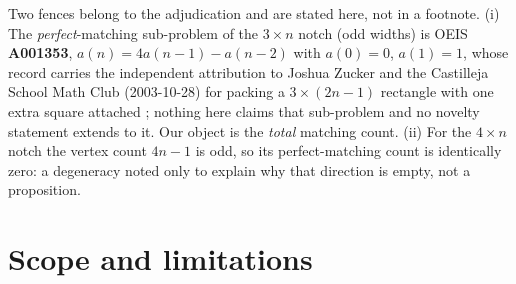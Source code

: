\documentclass[11pt]{article}
\begin{document}
Two fences belong to the adjudication and are stated here, not in a footnote.
(i) The \emph{perfect}-matching sub-problem of the $3 \times n$ notch (odd
widths) is OEIS \textbf{A001353}, $a(n) = 4a(n-1) - a(n-2)$ with $a(0) = 0$,
$a(1) = 1$, whose record carries the independent attribution to Joshua Zucker and
the Castilleja School Math Club (2003-10-28) for packing a $3 \times (2n-1)$
rectangle with one extra square attached \cite{oeis-a001353}; nothing here claims
that sub-problem and no novelty statement extends to it. Our object is the
\emph{total} matching count. (ii) For the $4 \times n$ notch the vertex count
$4n - 1$ is odd, so its perfect-matching count is identically zero: a degeneracy
noted only to explain why that direction is empty, not a proposition.

\section{Scope and limitations}
\end{document}
